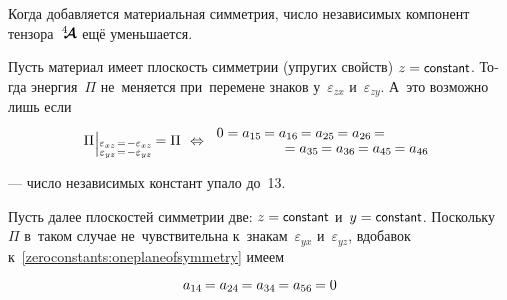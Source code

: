 \begin{otherlanguage}{russian}
\vspace{.1em} Когда добавляется материальная симметрия, число независимых компонент тензора~$\hspace{.08ex}{^4\hspace{-0.72ex}\bm{\mathcal{A}}}\hspace{.08ex}$ ещё уменьшается.

Пусть материал имеет плоскость симметрии (упругих свойств) ${z = \constant}$. Тогда энергия~$\Pi$ не~меняется при~перемене знаков у~$\varepsilon_{zx}$ и~$\varepsilon_{zy}$. А~это возможно лишь если
\begin{equation}\label{zeroconstants:oneplaneofsymmetry}
\Pi \hspace{.1ex} \raisemath{-0.2em}{\Bigr\vert}_{\substack{%
\varepsilon_{xz} \hspace{0.2ex}=\hspace{0.2ex} -\varepsilon_{xz} \\
\varepsilon_{yz} \hspace{0.2ex}=\hspace{0.2ex} -\varepsilon_{yz}
}} \hspace{-0.2ex} = \Pi
\:\,\Leftrightarrow \hspace{-3em}
\begin{array}{c}
0 =
a_{15} \hspace{-0.2ex} = a_{16} \hspace{-0.2ex} = a_{25} \hspace{-0.2ex} = a_{26} \hspace{-0.2ex} = \\[-0.1em]
\hspace{8em} = a_{35} \hspace{-0.2ex} = a_{36} \hspace{-0.2ex} = a_{45} \hspace{-0.2ex} = a_{46}
\end{array}
\end{equation}

\noindent --- число независимых констант упало до~13.

Пусть далее плоскостей симметрии две: ${z = \constant}$ и~${y = \constant}$.
Поскольку~$\Pi$ в~таком случае не~чувствительна к~знакам~$\varepsilon_{yx}$ и~$\varepsilon_{yz}$, вдобавок к~\eqref{zeroconstants:oneplaneofsymmetry} имеем

\nopagebreak\vspace{-0.22em}\begin{equation}\label{zeroconstants:2orthogonalplanesofsymmetry:orthotropic}
a_{14} \hspace{-0.2ex} = a_{24} \hspace{-0.2ex} = a_{34} \hspace{-0.2ex} = a_{56} \hspace{-0.2ex} = 0
\end{equation}


\end{otherlanguage}

